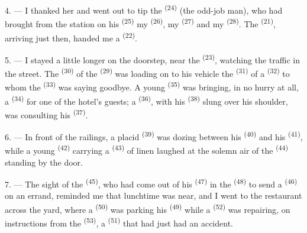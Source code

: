4. --- I thanked her and went out to tip the  \textsuperscript{(24)} (the
odd-job man), who had brought from the station on his
 \textsuperscript{(25)} my  \textsuperscript{(26)}, my
 \textsuperscript{(27)} and my  \textsuperscript{(28)}.
The  \textsuperscript{(21)}, arriving just then, handed me a
 \textsuperscript{(22)}.

5. --- I stayed a little longer on the doorstep, near the 
\textsuperscript{(23)}, watching the traffic in the street. The 
\textsuperscript{(30)} of the  \textsuperscript{(29)} was loading on to his
vehicle the  \textsuperscript{(31)} of a  \textsuperscript{(32)}
to whom the  \textsuperscript{(33)} was saying goodbye. A young
 \textsuperscript{(35)} was bringing, in no hurry at all, a
 \textsuperscript{(34)} for one of the hotel's guests; a
 \textsuperscript{(36)}, with his  \textsuperscript{(38)} slung over
his shoulder, was consulting his  \textsuperscript{(37)}.

\VUsaut{4.0mm}
\VUsaut{3.0mm}

6. --- In front of the railings, a placid  \textsuperscript{(39)} was
dozing between his  \textsuperscript{(40)} and his
 \textsuperscript{(41)}, while a young 
\textsuperscript{(42)} carrying a  \textsuperscript{(43)} of linen laughed at
the solemn air of the  \textsuperscript{(44)} standing by the door.

7. --- The sight of the  \textsuperscript{(45)}, who had come out of his
 \textsuperscript{(47)} in the  \textsuperscript{(48)} to send a
 \textsuperscript{(46)} on an errand, reminded me that lunchtime was
near, and I went to the restaurant across the yard, where a
 \textsuperscript{(50)} was parking his  \textsuperscript{(49)} while a
 \textsuperscript{(52)} was repairing, on instructions from the
 \textsuperscript{(53)}, a  \textsuperscript{(51)} that
had just had an accident.

